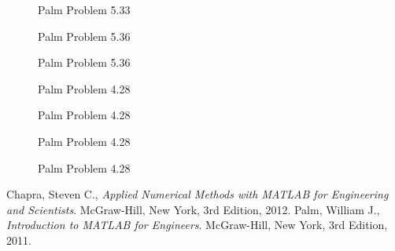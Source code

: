 \documentclass{article}
\begin{document}
\begin{figure}[htb!]
\begin{center}
\caption{Palm Problem 5.33}
\end{center}
\end{figure}

\begin{figure}[htb!]
\begin{center}
\caption{Palm Problem 5.36}
\end{center}
\end{figure}

\begin{figure}[htb!]
\begin{center}
\caption{Palm Problem 5.36}
\end{center}
\end{figure}

\begin{figure}[htb!]
\begin{center}
\caption{Palm Problem 4.28}
\end{center}
\end{figure}

\begin{figure}[htb!]
\begin{center}
\caption{Palm Problem 4.28}
\end{center}
\end{figure}

\begin{figure}[htb!]
\begin{center}
\caption{Palm Problem 4.28}
\end{center}
\end{figure}

\begin{figure}[htb!]
\begin{center}
\caption{Palm Problem 4.28}
\end{center}
\end{figure}

\pagebreak

\begin{thebibliography}{9}
  Chapra, Steven C.,
  {\it Applied Numerical Methods with MATLAB for Engineering and Scientists}.
  McGraw-Hill, New York,
  3rd Edition,
  2012.
  Palm, William J.,
  {\it Introduction to MATLAB for Engineers}.
  McGraw-Hill, New York,
  3rd Edition,
  2011.
\end{thebibliography}
\end{document}
